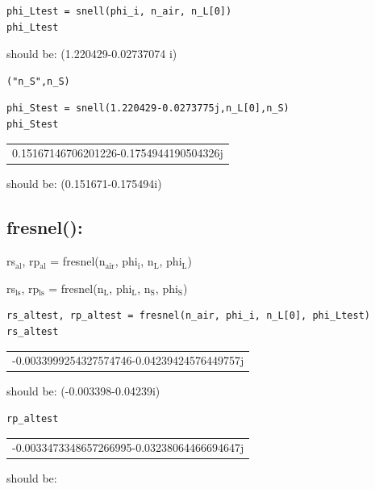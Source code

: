 \documentclass[11pt]{article}
\begin{document}
\begin{verbatim}
phi_Ltest = snell(phi_i, n_air, n_L[0])
phi_Ltest
\end{verbatim}
should be: (1.220429-0.02737074 i)

\begin{verbatim}
("n_S",n_S)
\end{verbatim}

\begin{verbatim}
phi_Stest = snell(1.220429-0.0273775j,n_L[0],n_S)
phi_Stest
\end{verbatim}

\begin{center}
\begin{tabular}{l}
0.15167146706201226-0.1754944190504326j\\
\end{tabular}
\end{center}
should be: (0.151671-0.175494i)



\subsection{fresnel():}
\label{sec:orgeed2fac}

rs\(_{\text{al}}\), rp\(_{\text{al}}\) = fresnel(n\(_{\text{air}}\), phi\(_{\text{i}}\), n\(_{\text{L}}\), phi\(_{\text{L}}\))

rs\(_{\text{ls}}\), rp\(_{\text{ls}}\) = fresnel(n\(_{\text{L}}\), phi\(_{\text{L}}\), n\(_{\text{S}}\), phi\(_{\text{S}}\))

\begin{verbatim}
rs_altest, rp_altest = fresnel(n_air, phi_i, n_L[0], phi_Ltest)
rs_altest
\end{verbatim}

\begin{center}
\begin{tabular}{l}
-0.0033999254327574746-0.04239424576449757j\\
\end{tabular}
\end{center}
should be: (-0.003398-0.04239i)
\begin{verbatim}
rp_altest
\end{verbatim}

\begin{center}
\begin{tabular}{l}
-0.0033473348657266995-0.03238064466694647j\\
\end{tabular}
\end{center}
should be: 
\end{document}
